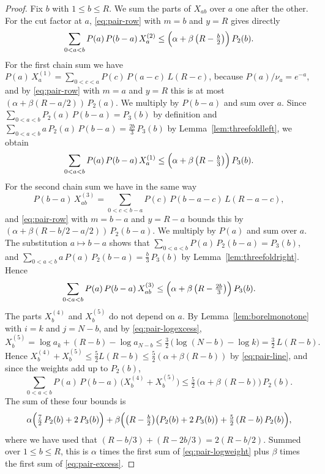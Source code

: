 \documentclass{amsart}
\theoremstyle{definition}
\theoremstyle{remark}
\numberwithin{equation}{section}
\begin{document}
\begin{proof}
Fix $b$ with $1\le b\le R$. We sum the parts of $X_{ab}$ over $a$ one after
the other. For the cut factor at $a$, \eqref{eq:pair-row} with $m=b$ and
$y=R$ gives directly
\[
\sum_{0<a<b}P(a)\,P(b-a)\,X^{(2)}_{a}
\le\Bigl(\alpha+\beta\,\bigl(R-\tfrac b2\bigr)\Bigr)\,P_2(b).
\]
For the first chain sum we have
$P(a)\,X^{(1)}_{a}=\sum_{0<c<a}P(c)\,P(a-c)\,L(R-c)$, because
$P(a)/\nu_a=e^{-a}$, and by \eqref{eq:pair-row} with $m=a$ and $y=R$ this is
at most $(\alpha+\beta(R-a/2))\,P_2(a)$. We multiply by $P(b-a)$ and sum
over $a$. Since $\sum_{0<a<b}P_2(a)\,P(b-a)=P_3(b)$ by definition and
$\sum_{0<a<b}a\,P_2(a)\,P(b-a)=\frac{2b}3\,P_3(b)$ by
Lemma~\ref{lem:threefoldleft}, we obtain
\[
\sum_{0<a<b}P(a)\,P(b-a)\,X^{(1)}_{a}
\le\Bigl(\alpha+\beta\,\bigl(R-\tfrac b3\bigr)\Bigr)\,P_3(b).
\]
For the second chain sum we have in the same way
\[
P(b-a)\,X^{(3)}_{ab}=\sum_{0<c<b-a}P(c)\,P(b-a-c)\,L(R-a-c),
\]
and \eqref{eq:pair-row} with $m=b-a$ and $y=R-a$ bounds this by
$(\alpha+\beta(R-b/2-a/2))\,P_2(b-a)$. We multiply by $P(a)$ and sum over
$a$. The substitution $a\mapsto b-a$ shows that
$\sum_{0<a<b}P(a)\,P_2(b-a)=P_3(b)$, and
$\sum_{0<a<b}a\,P(a)\,P_2(b-a)=\frac b3\,P_3(b)$ by
Lemma~\ref{lem:threefoldright}. Hence
\[
\sum_{0<a<b}P(a)\,P(b-a)\,X^{(3)}_{ab}
\le\Bigl(\alpha+\beta\,\bigl(R-\tfrac{2b}3\bigr)\Bigr)\,P_3(b).
\]
The parts $X^{(4)}_{b}$ and $X^{(5)}_{b}$ do not depend on $a$. By
Lemma~\ref{lem:borelmonotone} with $i=k$ and $j=N-b$, and by
\eqref{eq:pair-logexcess},
\[
X^{(5)}_{b}=\log a_k+(R-b)-\log a_{N-b}
\le\tfrac32\,\bigl(\log(N-b)-\log k\bigr)=\tfrac32\,L(R-b).
\]
Hence
$X^{(4)}_{b}+X^{(5)}_{b}\le\frac52L(R-b)\le\frac52(\alpha+\beta(R-b))$ by
\eqref{eq:pair-line}, and since the weights add up to $P_2(b)$,
\[
\sum_{0<a<b}P(a)\,P(b-a)\,\bigl(X^{(4)}_{b}+X^{(5)}_{b}\bigr)
\le\tfrac52\,\bigl(\alpha+\beta\,(R-b)\bigr)\,P_2(b).
\]
The sum of these four bounds is
\[
\alpha\Bigl(\tfrac72\,P_2(b)+2\,P_3(b)\Bigr)
+\beta\Bigl(\bigl(R-\tfrac b2\bigr)\bigl(P_2(b)+2\,P_3(b)\bigr)
+\tfrac52\,(R-b)\,P_2(b)\Bigr),
\]
where we have used that $(R-b/3)+(R-2b/3)=2(R-b/2)$. Summed over
$1\le b\le R$, this is $\alpha$ times the first sum of
\eqref{eq:pair-logweight} plus $\beta$ times the first sum of
\eqref{eq:pair-excess}.


\end{proof}
\end{document}
